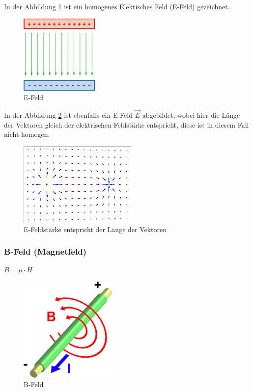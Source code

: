 \documentclass[a4paper]{scrartcl}
\begin{document}
In der Abbildung \ref{fig:E-Feld} ist ein homogenes Elektisches Feld (E-Feld) gezeichnet.

\begin{figure}[h!]
\begin{center}
\includegraphics[scale=0.5]{images/E-Feld.jpg}
\caption{E-Feld}
\label{fig:E-Feld}
\end{center}
\end{figure}

In der Abbildung \ref{fig:E-Feldstaerke} ist ebenfalls ein E-Feld $ \vec{E} $ abgebildet, wobei hier die Länge der Vektoren gleich der elektrischen Feldstärke entspricht, diese ist in diesem Fall nicht homogen.

\begin{figure}[h!]
\begin{center}
\includegraphics[scale=0.5]{images/E-Feldstaerke.png}
\caption{E-Feldstärke entspricht der Länge der Vektoren}
\label{fig:E-Feldstaerke}
\end{center}
\end{figure}



\subsubsection{B-Feld (Magnetfeld)}
$B = \mu \cdot H$\\
\begin{figure}[h!]
\begin{center}
\includegraphics[scale=0.5]{images/B-Feld.png}
\caption{B-Feld}
\label{fig:B-Feld}
\end{center}
\end{figure}
\end{document}
